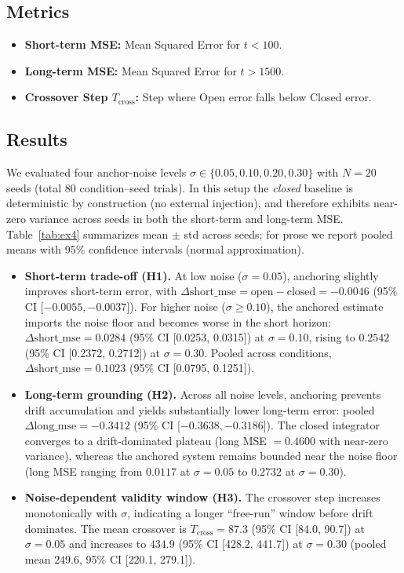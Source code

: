 \documentclass{article}
\begin{document}
\subsection{Metrics}
\begin{itemize}
    \item \textbf{Short-term MSE:} Mean Squared Error for $t < 100$.
    \item \textbf{Long-term MSE:} Mean Squared Error for $t > 1500$.
    \item \textbf{Crossover Step $T_{\text{cross}}$:} Step where Open error falls below Closed error.
\end{itemize}

\subsection{Results}
We evaluated four anchor-noise levels $\sigma \in \{0.05, 0.10, 0.20, 0.30\}$ with $N=20$ seeds (total 80 condition--seed trials).
In this setup the \emph{closed} baseline is deterministic by construction (no external injection), and therefore exhibits near-zero variance across seeds in both the short-term and long-term MSE.
Table~\ref{tab:ex4} summarizes mean $\pm$ std across seeds; for prose we report pooled means with 95\% confidence intervals (normal approximation).



\begin{itemize}
    \item \textbf{Short-term trade-off (H1).}
    At low noise ($\sigma=0.05$), anchoring slightly improves short-term error, with $\Delta\text{short\_mse}=\text{open}-\text{closed}=-0.0046$ (95\% CI [$-0.0055,-0.0037$]).
    For higher noise ($\sigma \ge 0.10$), the anchored estimate imports the noise floor and becomes worse in the short horizon: $\Delta\text{short\_mse}=0.0284$ (95\% CI [0.0253, 0.0315]) at $\sigma=0.10$, rising to $0.2542$ (95\% CI [0.2372, 0.2712]) at $\sigma=0.30$.
    Pooled across conditions, $\Delta\text{short\_mse}=0.1023$ (95\% CI [0.0795, 0.1251]).

    \item \textbf{Long-term grounding (H2).}
    Across all noise levels, anchoring prevents drift accumulation and yields substantially lower long-term error: pooled $\Delta\text{long\_mse}=-0.3412$ (95\% CI [$-0.3638, -0.3186$]).
    The closed integrator converges to a drift-dominated plateau (long MSE $= 0.4600$ with near-zero variance), whereas the anchored system remains bounded near the noise floor (long MSE ranging from $0.0117$ at $\sigma=0.05$ to $0.2732$ at $\sigma=0.30$).

    \item \textbf{Noise-dependent validity window (H3).}
    The crossover step increases monotonically with $\sigma$, indicating a longer ``free-run'' window before drift dominates.
    The mean crossover is $T_{\mathrm{cross}}=87.3$ (95\% CI [84.0, 90.7]) at $\sigma=0.05$ and increases to $434.9$ (95\% CI [428.2, 441.7]) at $\sigma=0.30$ (pooled mean $249.6$, 95\% CI [220.1, 279.1]).
\end{itemize}
\end{document}
